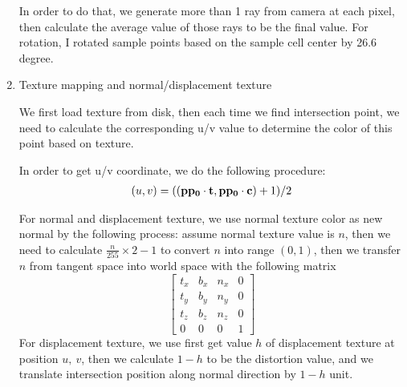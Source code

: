 \documentclass[acmtog]{acmart}
\begin{document}
\begin{enumerate}
	In order to do that, we generate more than 1 ray from camera at each pixel, then calculate the average value of those rays to be the final value. For rotation, I rotated sample points based on the sample cell center by 26.6 degree.
	\item Texture mapping and normal/displacement texture
	\par We first load texture from disk, then each time we find intersection point, we need to calculate the corresponding u/v value to determine the color of this point based on texture.
	\par In order to get u/v coordinate, we do the following procedure:
	\begin{align*}
		(u,v)=(({{\bf pp_0}\cdot {\bf t}, {\bf pp_0}\cdot {\bf c}}) + 1) / 2 
	\end{align*} 
	\par For normal and displacement texture, we use normal texture color as new normal by the following process: assume normal texture value is $n$, then we need to calculate $\frac{n}{255} \times 2 - 1$ to convert $n$ into range $(0, 1)$, then we transfer $n$ from tangent space into world space with the following matrix
	\[\begin{bmatrix}
		t_x & b_x & n_x & 0\\
		t_y & b_y & n_y & 0\\
		t_z & b_z & n_z & 0\\
		0 & 0 & 0 & 1
	\end{bmatrix}\]
	For displacement texture, we use first get value $h$ of displacement texture at position $u,\ v$, then we calculate $1 - h$ to be the distortion value, and we translate intersection position along normal direction by $1-h$ unit.
\end{enumerate}
\end{document}
